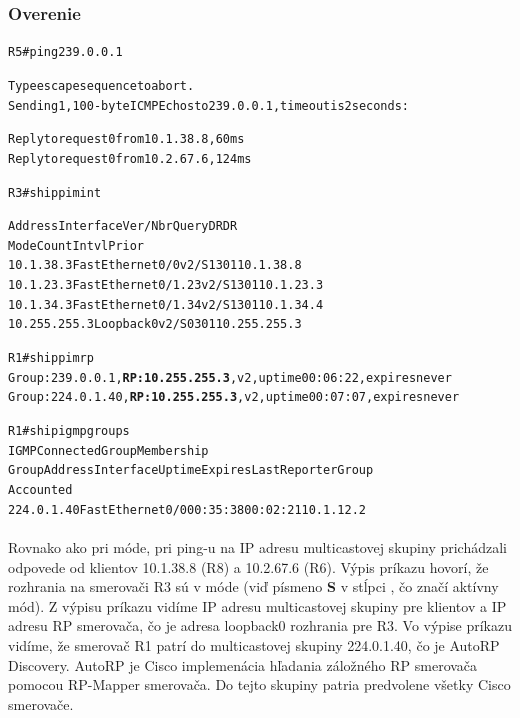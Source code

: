 \documentclass[12pt,twoside,a4paper]{report}
\begin{document}
\subsubsection{Overenie}

\noindent
{\selectfont
\begin{small}
\begin{alltt}
R5#ping 239.0.0.1

Type escape sequence to abort.
Sending 1, 100-byte ICMP Echos to 239.0.0.1, timeout is 2 seconds:

Reply to request 0 from 10.1.38.8, 60 ms
Reply to request 0 from 10.2.67.6, 124 ms
\end{alltt}
\end{small}
}

\noindent
{\selectfont
\begin{small}
\begin{alltt}

R3#sh ip pim int

Address          Interface            Ver/   Nbr    Query  DR     DR
                                      Mode   Count  Intvl  Prior
10.1.38.3        FastEthernet0/0      v2/S   1      30     1      10.1.38.8
10.1.23.3        FastEthernet0/1.23   v2/S   1      30     1      10.1.23.3
10.1.34.3        FastEthernet0/1.34   v2/S   1      30     1      10.1.34.4
10.255.255.3     Loopback0            v2/S   0      30     1      10.255.255.3

R1#sh ip pim rp    
Group: 239.0.0.1, \textbf{RP: 10.255.255.3}, v2, uptime 00:06:22, expires never
Group: 224.0.1.40, \textbf{RP: 10.255.255.3}, v2, uptime 00:07:07, expires never


R1#sh ip igmp groups
IGMP Connected Group Membership
Group Address  Interface         Uptime    Expires   Last Reporter   Group
                                                                     Accounted
224.0.1.40     FastEthernet0/0   00:35:38  00:02:21  10.1.12.2

\end{alltt}
\end{small}
}

\paragraph{}
Rovnako ako pri  móde, pri ping-u na IP adresu multicastovej skupiny prichádzali odpovede od klientov 10.1.38.8 (R8) a 10.2.67.6 (R6). Výpis príkazu  hovorí, že rozhrania na smerovači R3 sú v  móde (viď písmeno \textbf{S} v stĺpci , čo značí aktívny  mód). Z výpisu príkazu  vidíme IP adresu multicastovej skupiny pre klientov a IP adresu RP smerovača, čo je adresa loopback0 rozhrania pre R3.  Vo výpise príkazu  vidíme, že smerovač R1 patrí do multicastovej skupiny 224.0.1.40, čo je AutoRP Discovery. AutoRP je Cisco implemenácia hľadania záložného RP smerovača pomocou RP-Mapper smerovača. Do tejto skupiny patria predvolene všetky Cisco smerovače.
\end{document}
